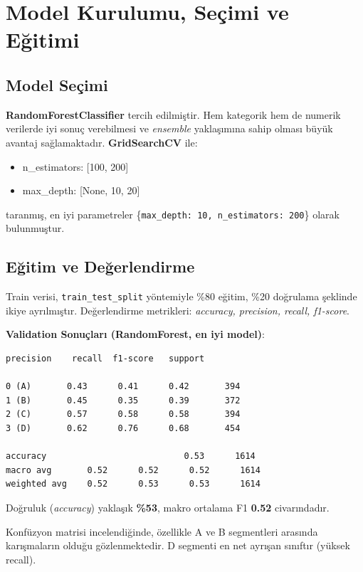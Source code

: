 \documentclass{article}
\begin{document}
\section{Model Kurulumu, Seçimi ve Eğitimi}

\subsection{Model Seçimi}

\textbf{RandomForestClassifier} tercih edilmiştir. Hem kategorik hem de numerik verilerde iyi sonuç verebilmesi ve \textit{ensemble} yaklaşımına sahip olması büyük avantaj sağlamaktadır. \textbf{GridSearchCV} ile:
\begin{itemize}
    \item n\_estimators: [100, 200]
    \item max\_depth: [None, 10, 20]
\end{itemize}
taranmış, en iyi parametreler \{\texttt{max\_depth: 10, n\_estimators: 200}\} olarak bulunmuştur.


\subsection{Eğitim ve Değerlendirme}

Train verisi, \texttt{train\_test\_split} yöntemiyle \%80 eğitim, \%20 doğrulama şeklinde ikiye ayrılmıştır. Değerlendirme metrikleri: \textit{accuracy, precision, recall, f1-score}.

\textbf{Validation Sonuçları (RandomForest, en iyi model)}:

\begin{verbatim}
precision    recall  f1-score   support

0 (A)       0.43      0.41      0.42       394
1 (B)       0.45      0.35      0.39       372
2 (C)       0.57      0.58      0.58       394
3 (D)       0.62      0.76      0.68       454

accuracy                           0.53      1614
macro avg       0.52      0.52      0.52      1614
weighted avg    0.52      0.53      0.53      1614
\end{verbatim}

Doğruluk (\textit{accuracy}) yaklaşık \textbf{\%53}, makro ortalama F1 \textbf{0.52} civarındadır.



Konfüzyon matrisi incelendiğinde, özellikle A ve B segmentleri arasında karışmaların olduğu gözlenmektedir. D segmenti en net ayrışan sınıftır (yüksek recall).
\end{document}
